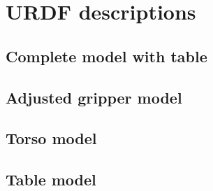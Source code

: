 
\chapter{URDF descriptions}
\label{app:urdf}

\lstset{style=customxml}

\section{Complete model with table}


\section{Adjusted gripper model}


\section{Torso model}


\section{Table model}
